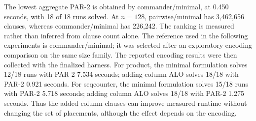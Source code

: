 The lowest aggregate PAR-2 is obtained by commander/minimal, at 0.450 seconds, with 18 of 18 runs solved. At $n=128$, pairwise/minimal has 3,462,656 clauses, whereas commander/minimal has 226,242. The ranking is measured rather than inferred from clause count alone. The reference used in the following experiments is commander/minimal; it was selected after an exploratory encoding comparison on the same size family. The reported encoding results were then collected with the finalized harness.
For product, the minimal formulation solves 12/18 runs with PAR-2 7.534 seconds; adding column ALO solves 18/18 with PAR-2 0.921 seconds. For seqcounter, the minimal formulation solves 15/18 runs with PAR-2 5.718 seconds; adding column ALO solves 18/18 with PAR-2 1.275 seconds. Thus the added column clauses can improve measured runtime without changing the set of placements, although the effect depends on the encoding.
